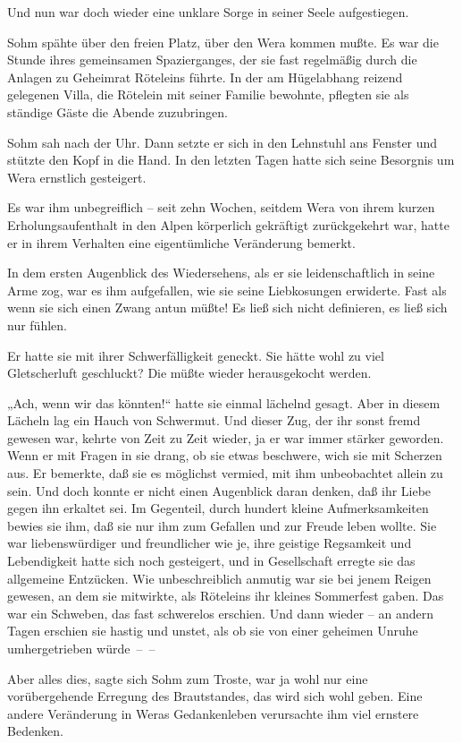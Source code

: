 Und nun war doch wieder eine unklare Sorge in seiner Seele
aufgestiegen.

Sohm spähte über den freien Platz, über den Wera kommen mußte. Es
war die Stunde ihres gemeinsamen Spazierganges, der sie fast
regelmäßig durch die Anlagen zu Geheimrat Röteleins führte. In der
am Hügelabhang reizend gelegenen Villa, die Rötelein mit seiner
Familie bewohnte, pflegten sie als ständige Gäste die Abende
zuzubringen.

Sohm sah nach der Uhr. Dann setzte er sich in den Lehnstuhl ans
Fenster und stützte den Kopf in die Hand. In den letzten Tagen
hatte sich seine Besorgnis um Wera ernstlich gesteigert.

Es war ihm unbegreiflich – seit zehn Wochen, seitdem Wera von ihrem
kurzen Erholungsaufenthalt in den Alpen körperlich gekräftigt
zurückgekehrt war, hatte er in ihrem Verhalten eine eigentümliche
Veränderung bemerkt.

In dem ersten Augenblick des Wiedersehens, als er sie
leidenschaftlich in seine Arme zog, war es ihm aufgefallen, wie sie
seine Liebkosungen erwiderte. Fast als wenn sie sich einen Zwang
antun müßte! Es ließ sich nicht definieren, es ließ sich nur
fühlen.

Er hatte sie mit ihrer Schwerfälligkeit geneckt. Sie hätte wohl zu
viel Gletscherluft geschluckt? Die müßte wieder herausgekocht
werden.

„Ach, wenn wir das könnten!“ hatte sie einmal lächelnd gesagt. Aber
in diesem Lächeln lag ein Hauch von Schwermut. Und dieser Zug, der
ihr sonst fremd gewesen war, kehrte von Zeit zu Zeit wieder, ja er
war immer stärker geworden. Wenn er mit Fragen in sie drang, ob sie
etwas beschwere, wich sie mit Scherzen aus. Er bemerkte, daß sie es
möglichst vermied, mit ihm unbeobachtet allein zu sein. Und doch
konnte er nicht einen Augenblick daran denken, daß ihr Liebe gegen
ihn erkaltet sei. Im Gegenteil, durch hundert kleine
Aufmerksamkeiten bewies sie ihm, daß sie nur ihm zum Gefallen und
zur Freude leben wollte. Sie war liebenswürdiger und freundlicher
wie je, ihre geistige Regsamkeit und Lebendigkeit hatte sich noch
gesteigert, und in Gesellschaft erregte sie das allgemeine
Entzücken. Wie unbeschreiblich anmutig war sie bei jenem Reigen
gewesen, an dem sie mitwirkte, als Röteleins ihr kleines Sommerfest
gaben. Das war ein Schweben, das fast schwerelos erschien. Und dann
wieder – an andern Tagen erschien sie hastig und unstet, als ob sie
von einer geheimen Unruhe umhergetrieben würde~–~–

Aber alles dies, sagte sich Sohm zum Troste, war ja wohl nur eine
vorübergehende Erregung des Brautstandes, das wird sich wohl geben.
Eine andere Veränderung in Weras Gedankenleben verursachte ihm viel
ernstere Bedenken.

